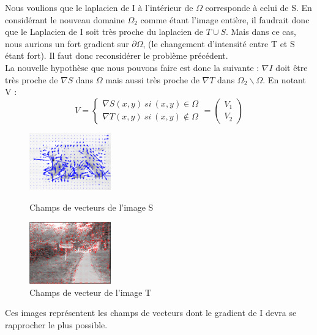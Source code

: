 Nous voulions que le laplacien de I à l'intérieur de $\Omega$ corresponde à celui de S. En considérant le nouveau domaine $\Omega_2$ comme étant l'image entière, il faudrait donc que le Laplacien de I soit très proche du laplacien de $T \cup S$. Mais dans ce cas, nous aurions un fort gradient sur $\partial \Omega$, (le  changement d'intensité entre T et S étant fort). Il faut donc reconsidérer le problème précédent. \\
La nouvelle hypothèse que nous pouvons faire est donc la suivante : $\nabla I$ doit être très proche de $\nabla S$ dans $\Omega$ mais aussi très proche de $\nabla T$ dans $\Omega_2 \backslash \Omega$. En notant V : 
\begin{equation}
V = 
\left\{
\begin{aligned}
\nabla S(x,y) \ si \ (x,y) \in \Omega\\
\nabla T(x,y) \ si \ (x,y) \notin \Omega
\end{aligned}
\right.
= \begin{pmatrix}
V_1\\
V_2
\end{pmatrix}
\end{equation}
\begin{figure}[!htb]
   \begin{minipage}{0.5\textwidth}
     \centering
     \includegraphics[width = 100pt]{Images/vector_fieldOurs.png}
\caption{Champs de vecteurs de l'image S}
      \end{minipage}\hfill
         \begin{minipage}{0.5\textwidth}
     \centering
     \includegraphics[width = 100pt]{Images/vector_fieldOursT.png}
\caption{Champs de vecteur de l'image T}
      \end{minipage}\hfill
      \end{figure}
Ces images représentent les champs de vecteurs dont le gradient de I devra se rapprocher le plus possible.
